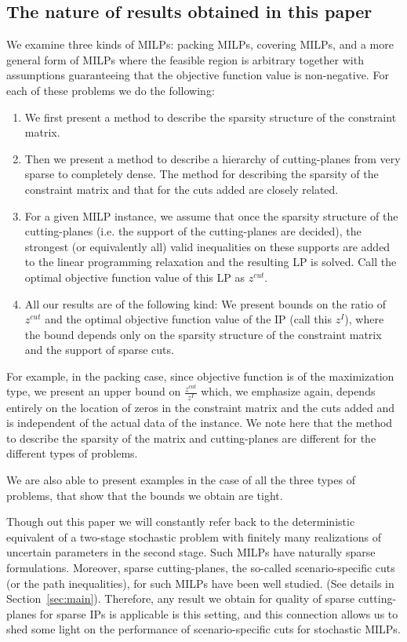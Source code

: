 \documentclass[smallextended]{svjour3}
\begin{document}
\subsection{The nature of results obtained in this paper}
We examine three kinds of MILPs: packing MILPs, covering MILPs, and a more general form of MILPs where the feasible region is arbitrary together with assumptions guaranteeing that the objective function value is non-negative. For each of these problems we do the following:
\begin{enumerate}
\item We first present a method to describe the sparsity structure of the constraint matrix.
\item Then we present a method to describe a hierarchy of cutting-planes from very sparse to completely dense. The method for describing the sparsity of the constraint matrix and that for the cuts added are closely related.
\item For a given MILP instance, we assume that once the sparsity structure of the cutting-planes (i.e. the support of the cutting-planes are decided), the strongest (or equivalently all) valid inequalities on these supports are added to the linear programming relaxation and the resulting LP is solved. Call the optimal objective function value of this LP as $z^{cut}$. 
\item All our results are of the following kind: We present bounds on the ratio of $z^{cut}$ and the optimal objective function value of the IP (call this $z^I$), where the bound depends only on the sparsity structure of the constraint matrix and the support of sparse cuts. 
\end{enumerate}
For example, in the packing case, since objective function is of the maximization type, we present an upper bound on $\frac{z^{cut}}{z^I}$ which, we emphasize again, depends entirely on the location of zeros in the constraint matrix and the cuts added and is independent of the actual data of the instance. We note here that the method to describe the sparsity of the matrix and cutting-planes are different for the different types of problems.

We are also able to present examples in the case of all the three types of problems, that show that the bounds we obtain are tight. 

Though out this paper we will constantly refer back to the deterministic equivalent of a two-stage stochastic problem with finitely many realizations of uncertain parameters in the second stage. Such MILPs have naturally sparse formulations. Moreover, sparse cutting-planes, the so-called scenario-specific cuts (or the path inequalities), for such MILPs have been well studied. (See details in Section~\ref{sec:main}). Therefore, any result we obtain for quality of sparse cutting-planes for sparse IPs is applicable is this setting, and this connection allows us to shed some light on the performance of scenario-specific cuts for stochastic MILPs. 
\end{document}
